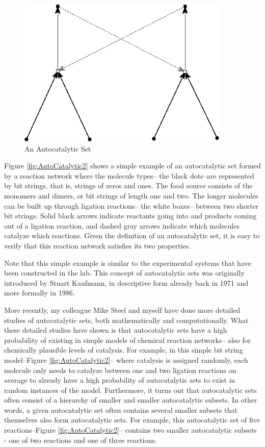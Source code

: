 \documentclass[]{article}
\begin{document}
\begin{figure}[H]
	\caption{An Autocatalytic Set}\label{fig:AutoCatalytic1}
	\includegraphics[width=0.9\textwidth]{AutoCatalytic1}
\end{figure}

Figure \ref{fig:AutoCatalytic2} shows a simple example
of an autocatalytic set formed by a reaction network where the molecule types--
the black dots--are represented by bit strings, that is, strings of zeros and ones.
The food source consists of
the monomers and dimers,
or bit strings of length one and two.
The longer molecules can be built up
through ligation reactions--
the white boxes--
between two shorter bit strings.
Solid black arrows indicate
reactants going into
and products coming out of
a ligation reaction,
and dashed gray arrows indicate which
molecules catalyze which reactions.
Given the definition
of an autocatalytic set,
it is easy to verify that this reaction
network satisfies its two properties.

Note that this simple example is similar to the experimental systems that have been constructed in the lab.
This concept of autocatalytic sets was originally introduced by Stuart Kaufmann, in descriptive form already back in 1971 and more formally in 1986.

More recently,
my colleague Mike Steel and myself
have done more detailed studies
of autocatalytic sets,
both mathematically
and computationally.
What these detailed studies have shown
is that autocatalytic sets
have a high probability of existing
in simple models
of chemical reaction networks--
also for chemically plausible
levels of catalysis.
For example,
in this simple bit string model--Figure \ref{fig:AutoCatalytic2}--
where catalysis is assigned randomly,
each molecule only needs to catalyze
between one and two ligation
reactions on average
to already have a high probability
of autocatalytic sets to exist
in random instances of the model.
Furthermore, it turns out that
autocatalytic sets
often consist of a hierarchy of smaller
and smaller autocatalytic subsets.
In other words,
a given autocatalytic set
often contains several smaller subsets
that themselves also form
autocatalytic sets.
For example,
this autocatalytic set of five reactions--Figure \ref{fig:AutoCatalytic2}--
contains two smaller
autocatalytic subsets -
one of two reactions
and one of three reactions.
\end{document}
